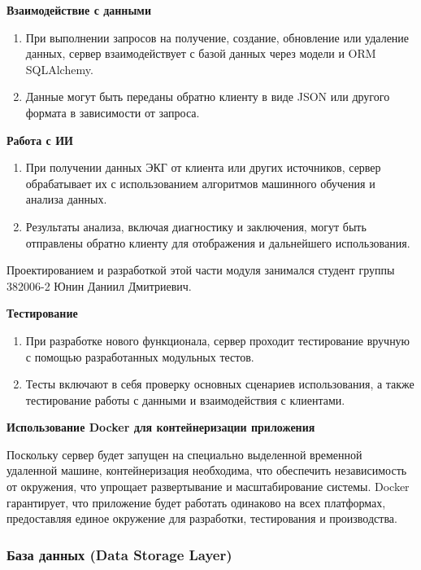\documentclass[12pt, russian]{extarticle}
\begin{document}
\begin{spacing}{1.5}
\par \noindent \textbf{Взаимодействие с данными}
\begin{enumerate}
    \item При выполнении запросов на получение, создание, обновление или удаление данных, сервер взаимодействует с базой данных через модели и ORM SQLAlchemy.
    \item Данные могут быть переданы обратно клиенту в виде JSON или другого формата в зависимости от запроса.
\end{enumerate}

\par \noindent \textbf{Работа с ИИ}
\begin{enumerate}
    \item При получении данных ЭКГ от клиента или других источников, сервер обрабатывает их с использованием алгоритмов машинного обучения и анализа данных.
    \item Результаты анализа, включая диагностику и заключения, могут быть отправлены обратно клиенту для отображения и дальнейшего использования.
\end{enumerate}

Проектированием и разработкой этой части модуля занимался студент группы 382006-2 Юнин Даниил Дмитриевич.

\par \noindent \textbf{Тестирование}
\begin{enumerate}
    \item При разработке нового функционала, сервер проходит тестирование вручную с помощью разработанных модульных тестов.
    \item Тесты включают в себя проверку основных сценариев использования, а также тестирование работы с данными и взаимодействия с клиентами.
\end{enumerate}

\par \noindent \textbf{Использование Docker для контейнеризации приложения}

Поскольку сервер будет запущен на специально выделенной временной удаленной машине, контейнеризация необходима, что обеспечить независимость от окружения, что упрощает развертывание и масштабирование системы. Docker гарантирует, что приложение будет работать одинаково на всех платформах, предоставляя единое окружение для разработки, тестирования и производства.

\subsubsection{База данных (Data Storage Layer)}


\end{spacing}
\end{document}
